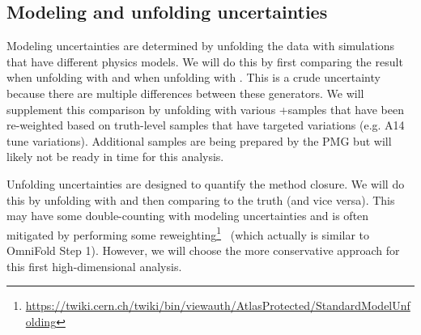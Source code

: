 \subsection{Modeling and unfolding uncertainties}

Modeling uncertainties are determined by unfolding the data with simulations that have different physics models.  We will do this by first comparing the result when unfolding with \pythia and when unfolding with \sherpa.  This is a crude uncertainty because there are multiple differences between these generators.  We will supplement this comparison by unfolding with various \powheg+\pythia samples that have been re-weighted based on truth-level samples that have targeted variations (e.g. A14 tune variations).  Additional samples are being prepared by the PMG but will likely not be ready in time for this analysis.

Unfolding uncertainties are designed to quantify the method closure.  We will do this by unfolding \pythia with \sherpa and then comparing to the \pythia truth (and vice versa).  This may have some double-counting with modeling uncertainties and is often mitigated by performing some reweighting\footnote{\url{https://twiki.cern.ch/twiki/bin/viewauth/AtlasProtected/StandardModelUnfolding}}~\cite{Malaescu:2009dm} (which actually is similar to OmniFold Step 1).  However, we will choose the more conservative approach for this first high-dimensional analysis.